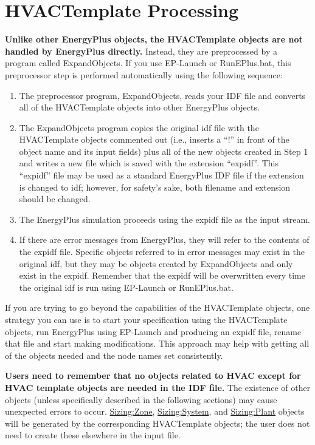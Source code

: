 \section{HVACTemplate Processing}\label{hvactemplate-processing}

\textbf{Unlike other EnergyPlus objects, the HVACTemplate objects are not handled by EnergyPlus directly.} Instead, they are preprocessed by a program called ExpandObjects. If you use EP-Launch or RunEPlus.bat, this preprocessor step is performed automatically using the following sequence:

\begin{enumerate}
\def\labelenumi{\arabic{enumi})}
\item
  The preprocessor program, ExpandObjects, reads your IDF file and converts all of the HVACTemplate objects into other EnergyPlus objects.
\item
  The ExpandObjects program copies the original idf file with the HVACTemplate objects commented out (i.e., inserts a ``!'' in front of the object name and its input fields) plus all of the new objects created in Step 1 and writes a new file which is saved with the extension ``expidf''. This ``expidf'' file may be used as a standard EnergyPlus IDF file if the extension is changed to idf; however, for safety's sake, both filename and extension should be changed.
\item
  The EnergyPlus simulation proceeds using the expidf file as the input stream.
\item
  If there are error messages from EnergyPlus, they will refer to the contents of the expidf file. Specific objects referred to in error messages may exist in the original idf, but they may be objects created by ExpandObjects and only exist in the expidf. Remember that the expidf will be overwritten every time the original idf is run using EP-Launch or RunEPlus.bat.
\end{enumerate}

If you are trying to go beyond the capabilities of the HVACTemplate objects, one strategy you can use is to start your specification using the HVACTemplate objects, run EnergyPlus using EP-Launch and producing an expidf file, rename that file and start making modifications. This approach may help with getting all of the objects needed and the node names set consistently.

\textbf{Users need to remember that no objects related to HVAC except for HVAC template objects are needed in the IDF file.} The existence of other objects (unless specifically described in the following sections) may cause unexpected errors to occur. \hyperref[sizingzone]{Sizing:Zone}, \hyperref[sizingsystem]{Sizing:System}, and \hyperref[sizingplant]{Sizing:Plant} objects will be generated by the corresponding HVACTemplate objects; the user does not need to create these elsewhere in the input file.

